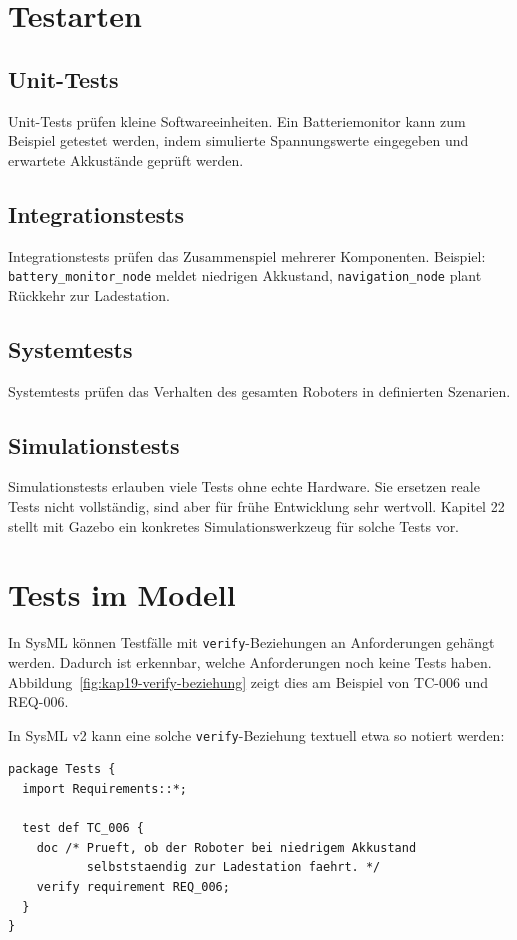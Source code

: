 \section{Testarten}
\subsection{Unit-Tests}
Unit-Tests prüfen kleine Softwareeinheiten. Ein Batteriemonitor kann zum Beispiel getestet werden, indem simulierte Spannungswerte eingegeben und erwartete Akkustände geprüft werden.

\subsection{Integrationstests}
Integrationstests prüfen das Zusammenspiel mehrerer Komponenten. Beispiel: \texttt{battery\_monitor\_node} meldet niedrigen Akkustand, \texttt{navigation\_node} plant Rückkehr zur Ladestation.

\subsection{Systemtests}
Systemtests prüfen das Verhalten des gesamten Roboters in definierten Szenarien.

\subsection{Simulationstests}
Simulationstests erlauben viele Tests ohne echte Hardware. Sie ersetzen reale Tests nicht vollständig, sind aber für frühe Entwicklung sehr wertvoll. Kapitel 22 stellt mit Gazebo ein konkretes Simulationswerkzeug für solche Tests vor.

\section{Tests im Modell}
In SysML können Testfälle mit \texttt{verify}-Beziehungen an Anforderungen gehängt werden. Dadurch ist erkennbar, welche Anforderungen noch keine Tests haben. Abbildung~\ref{fig:kap19-verify-beziehung} zeigt dies am Beispiel von TC-006 und REQ-006.

In SysML v2 kann eine solche \texttt{verify}-Beziehung textuell etwa so notiert werden:

\begin{lstlisting}
package Tests {
  import Requirements::*;

  test def TC_006 {
    doc /* Prueft, ob der Roboter bei niedrigem Akkustand
           selbststaendig zur Ladestation faehrt. */
    verify requirement REQ_006;
  }
}
\end{lstlisting}

